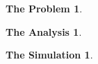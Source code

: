 \documentclass{article}
\theoremstyle{break}
\newcommand{\problem}[2]{\theoremstyle{break} \newtheorem*{thm#1}{#1}\begin{thm#1}#2\end{thm#1}}
\begin{document}
\problem{The Problem}{}
\medskip
\problem{The Analysis}{}
\medskip
\problem{The Simulation}{}
\end{document}
